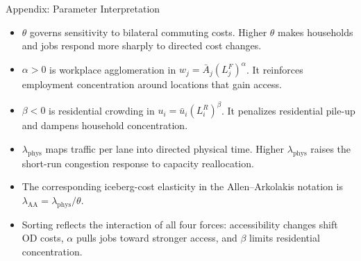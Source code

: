 \documentclass[11pt,aspectratio=169]{beamer}
\newcommand{\navback}[1]{\par\vspace{0.35em}\noindent\hfill\hyperlink{#1}{\beamerreturnbutton{back}}}
\begin{document}
\begin{frame}[label=appparams]{Appendix: Parameter Interpretation}
\begin{itemize}\small
  \item $\theta$ governs sensitivity to bilateral commuting costs. Higher $\theta$ makes households and jobs respond more sharply to directed cost changes.
  \item $\alpha>0$ is workplace agglomeration in $w_j=\bar A_j(L_j^F)^\alpha$. It reinforces employment concentration around locations that gain access.
  \item $\beta<0$ is residential crowding in $u_i=\bar u_i(L_i^R)^\beta$. It penalizes residential pile-up and dampens household concentration.
  \item $\lambda_{\mathrm{phys}}$ maps traffic per lane into directed physical time. Higher $\lambda_{\mathrm{phys}}$ raises the short-run congestion response to capacity reallocation.
  \item The corresponding iceberg-cost elasticity in the Allen--Arkolakis notation is $\lambda_{\mathrm{AA}}=\lambda_{\mathrm{phys}}/\theta$.
  \item Sorting reflects the interaction of all four forces: accessibility changes shift OD costs, $\alpha$ pulls jobs toward stronger access, and $\beta$ limits residential concentration.
\end{itemize}
\navback{estparams}
\end{frame}
\end{document}
